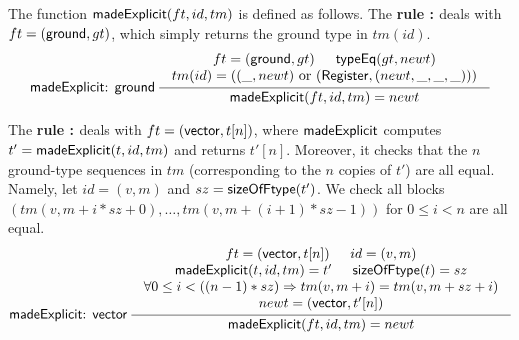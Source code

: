 The function ${\sf madeExplicit}(ft, id, tm)$ is defined as follows. %
%
The \textbf{rule {\madeexplicit: \gtype}} deals with $ft = ({\sf ground}, gt)$, which simply returns the ground type in $tm(id)$.
%
\[
\infer[\madeexplicit: \gtype]
{\seqq{\madeexplicit(ft, id, tm) = newt}}
{
	\begin{array}{c}
        ft = (\gtype, gt) \hspace{15pt}\typeeq(gt, newt) \\
	   tm(id) = ( (\_, newt)\ \mbox{or}\  (\register, (newt, \_, \_, \_)))
	\end{array}
}
\]

The \textbf{rule {\madeexplicit: \vtype}} deals with $ft = ({\sf vector}, t[n])$, where ${\sf madeExplicit}$  computes $t' = {\sf madeExplicit}(t, id, tm)$ and  returns $t'[n]$. Moreover, it checks that the $n$ ground-type sequences in $tm$ (corresponding to the $n$ copies of $t'$) are all equal. Namely,  let $id = (v,m)$ and $sz = {\sf sizeOfFtype}(t')$. We check all blocks $(tm(v, m+ i*sz + 0), \ldots, tm(v, m+(i+1)*sz-1))$ for $0\leq i<n$ are all equal. %
\[
\infer[\madeexplicit: \vtype]
{\seqq{\madeexplicit(ft, id, tm) = newt}}
{
	\begin{array}{c}
		ft = (\vtype, t[n])\hspace{15pt} id = (v, m) \\
		\madeexplicit(t, id, tm) = t' \hspace{15pt} \sizeofftype(t) = sz \\
		\forall 0 \le i < ((n-1)*sz) \Rightarrow tm(v, m+i) = tm(v, m+sz + i) \\
		newt = (\vtype, t'[n])
	\end{array}
}
\]

